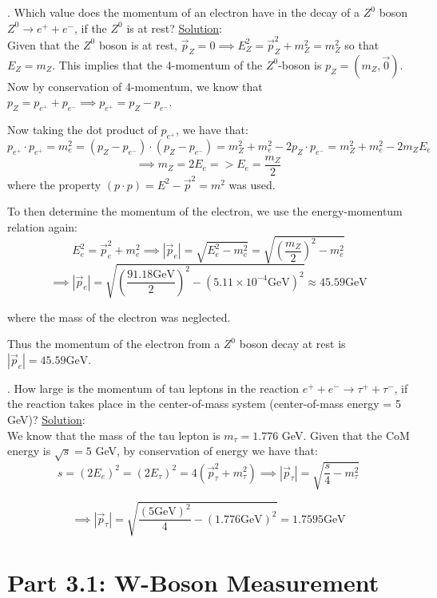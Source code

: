 \documentclass[a4paper]{report}
\numberwithin{equation}{section}
\begin{document}
. Which value does the momentum of an electron have in the decay of a $Z^0$ boson $Z^0 \rightarrow e^+ + e^-$, if the $Z^0$ is at rest? 
\bigbreak
\noindent \underline{Solution}: \\
\noindent Given that the $Z^0$ boson is at rest, $\vec{p}_Z = 0 \implies E_Z^2 = \vec{p}_Z^2 + m_Z^2 = m_Z^2$ so that $E_Z = m_Z$. This implies that the 4-momentum of the $Z^0$-boson is $p_Z = (m_Z, \vec{0})$. 
\noindent Now by conservation of 4-momentum, we know that $p_Z = p_{e^+} + p_{e^-} \implies p_{e^+} = p_Z - p_{e^-}$. 

\noindent Now taking the dot product of $p_{e^+}$, we have that:
$$
p_{e^+} \cdot p_{e^+} = m_e^2 = (p_Z - p_{e^-}) \cdot (p_Z - p_{e^-}) = m_Z^2 + m_e^2 - 2 p_Z \cdot p_{e^-} = m_Z^2 + m_e^2 - 2m_Z E_e
$$
$$
\implies m_Z = 2E_e => E_e = \frac{m_Z}{2}
$$
\noindent where the property $(p \cdot p) = E^2 - \vec{p}^2 = m^2$ was used. 

\noindent To then determine the momentum of the electron, we use the energy-momentum relation again:
$$E_e^2 = \vec{p}_e^2 + m_e^2 \implies |\vec{p}_e| = \sqrt{E_e^2 - m_e^2} = \sqrt{\left(\frac{m_Z}{2}\right)^2- m_e^2}$$
$$\implies |\vec{p}_e| = \sqrt{\left(\frac{91.18 \text{GeV} }{2}\right)^2 - (5.11 \times 10^{-4} \text{GeV})^2} \approx 45.59 \text{GeV}$$

\noindent where the mass of the electron was neglected. 

\noindent Thus the momentum of the electron from a $Z^0$ boson decay at rest is $|\vec{p}_e| = 45.59 \text{GeV}$. 

\bigbreak

. How large is the momentum of tau leptons in the reaction $e^+ + e^- \rightarrow \tau^+ + \tau^-$, if the reaction takes place in the center-of-mass system (center-of-mass energy = 5 GeV)?
\bigbreak
\noindent \underline{Solution}: \\
\noindent We know that the mass of the tau lepton is $m_\tau = 1.776$ GeV. Given that the CoM energy is $\sqrt{s} = 5$ GeV, by conservation of energy we have that:
$$s = (2 E_e)^2 = (2 E_\tau)^2 = 4 (\vec{p}_\tau^2 + m_\tau^2) \implies |\vec{p}_\tau| = \sqrt{\frac{s}{4} - m_\tau^2}$$

$$
\implies |\vec{p}_\tau| = \sqrt{\frac{(5 \text{GeV})^2}{4} - (1.776 \text{GeV})^2} = 1.7595 \text{GeV}
$$

\section{Part 3.1: W-Boson Measurement}
\end{document}

